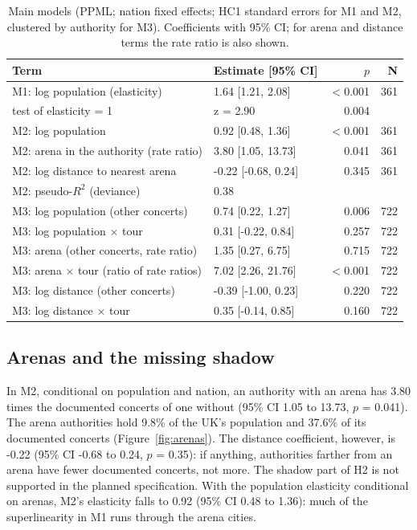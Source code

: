 \documentclass[11pt,a4paper]{article}
\begin{document}
\begin{table}[tbp]\centering\small\caption{Main models (PPML; nation fixed effects; HC1 standard errors for M1 and M2, clustered by authority for M3). Coefficients with 95\% CI; for arena and distance terms the rate ratio is also shown.}\label{tab:main}\begin{tabular}{p{6.3cm}lrr}\toprule Term & Estimate [95\% CI] & $p$ & N\\\midrule
M1: log population (elasticity) & 1.64 [1.21, 2.08] & $<$0.001 & 361\\
\quad test of elasticity = 1 & z = 2.90 & 0.004 & \\\midrule
M2: log population & 0.92 [0.48, 1.36] & $<$0.001 & 361\\
M2: arena in the authority (rate ratio) & 3.80 [1.05, 13.73] & 0.041 & 361\\
M2: log distance to nearest arena & -0.22 [-0.68, 0.24] & 0.345 & 361\\
M2: pseudo-$R^2$ (deviance) & 0.38 & & \\\midrule
M3: log population (other concerts) & 0.74 [0.22, 1.27] & 0.006 & 722\\
M3: log population $\times$ tour & 0.31 [-0.22, 0.84] & 0.257 & 722\\
M3: arena (other concerts, rate ratio) & 1.35 [0.27, 6.75] & 0.715 & 722\\
M3: arena $\times$ tour (ratio of rate ratios) & 7.02 [2.26, 21.76] & $<$0.001 & 722\\
M3: log distance (other concerts) & -0.39 [-1.00, 0.23] & 0.220 & 722\\
M3: log distance $\times$ tour & 0.35 [-0.14, 0.85] & 0.160 & 722\\
\bottomrule\end{tabular}\end{table}

\subsection{Arenas and the missing shadow}
In M2, conditional on population and nation, an authority with an arena has 3.80 times the documented concerts of one without (95\% CI 1.05 to 13.73, $p$ = 0.041). The arena authorities hold 9.8\% of the UK's population and 37.6\% of its documented concerts (Figure~\ref{fig:arenas}). The distance coefficient, however, is -0.22 (95\% CI -0.68 to 0.24, $p$ = 0.35): if anything, authorities farther from an arena have fewer documented concerts, not more. The shadow part of H2 is not supported in the planned specification. With the population elasticity conditional on arenas, M2's elasticity falls to 0.92 (95\% CI 0.48 to 1.36): much of the superlinearity in M1 runs through the arena cities.
\end{document}
